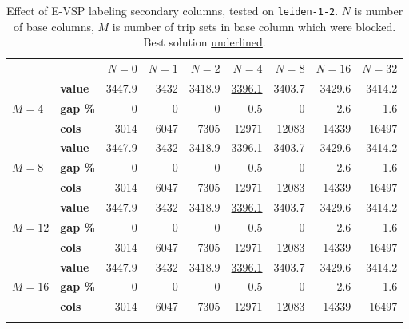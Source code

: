 \documentclass[]{article}
\begin{document}
\begin{table}[h]
  \centering
  \begin{tabular}{llrrrrrrr}
    \toprule
    && $N=0$ & $N=1$ & $N=2$ & $N=4$ & $N=8$ & $N=16$ & $N=32$\\
    \arrayrulecolor{black!30}\cmidrule(lr){1-9}
    \addlinespace[0.4em]
     & \textbf{value}  & 3447.9 & 3432 & 3418.9 & \underline{3396.1} & 3403.7 & 3429.6 & 3414.2 \\
    $M=4$ & \textbf{gap \%}   & 0 & 0 & 0 & 0.5 & 0 & 2.6 & 1.6 \\
    & \textbf{cols} & 3014 & 6047 & 7305 & 12971 & 12083 & 14339 & 16497 \\
    \arrayrulecolor{black!30}\cmidrule(lr){1-9}
    & \textbf{value}  & 3447.9 & 3432 & 3418.9 & \underline{3396.1} & 3403.7 & 3429.6 & 3414.2 \\
    $M=8$ & \textbf{gap \%}   & 0 & 0 & 0 & 0.5 & 0 & 2.6 & 1.6 \\
    & \textbf{cols} & 3014 & 6047 & 7305 & 12971 & 12083 & 14339 & 16497 \\
    \arrayrulecolor{black!30}\cmidrule(lr){1-9}
    & \textbf{value}  & 3447.9 & 3432 & 3418.9 & \underline{3396.1} & 3403.7 & 3429.6 & 3414.2 \\
    $M=12$ & \textbf{gap \%}   & 0 & 0 & 0 & 0.5 & 0 & 2.6 & 1.6 \\
    & \textbf{cols} & 3014 & 6047 & 7305 & 12971 & 12083 & 14339 & 16497 \\
    \arrayrulecolor{black!30}\cmidrule(lr){1-9}
    & \textbf{value}  & 3447.9 & 3432 & 3418.9 & \underline{3396.1} & 3403.7 & 3429.6 & 3414.2 \\
    $M=16$ & \textbf{gap \%}   & 0 & 0 & 0 & 0.5 & 0 & 2.6 & 1.6 \\
    & \textbf{cols} & 3014 & 6047 & 7305 & 12971 & 12083 & 14339 & 16497 \\
    \arrayrulecolor{black}\bottomrule
  \end{tabular}
  \caption{Effect of E-VSP labeling secondary columns, tested on \texttt{leiden-1-2}. $N$ is number of base columns, $M$ is number of trip sets in base column which were blocked. Best solution \underline{underlined}.}
  \label{tab:evsp-secondary-columns}
\end{table}
\end{document}
